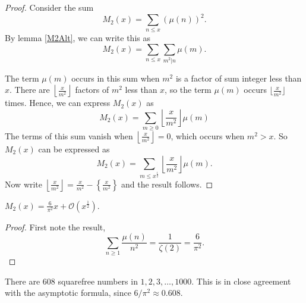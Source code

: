 \documentclass{unswmaths}
\begin{document}
\begin{proof}
    Consider the sum
    \begin{equation*}
        M_2(x) = \sum_{n\leq x} (\mu(n))^2.
    \end{equation*}
    By lemma \ref{M2Alt}, we can write this as
    \begin{equation*}
        M_2(x) = \sum_{n\leq x}\sum_{m^2|n}\mu(m).
    \end{equation*}
    
    The term $\mu(m)$ occurs in this sum when $m^2$ is a factor of sum integer
    less than $x$. There are $\left\lfloor \frac{x}{m^2}\right\rfloor$ factors of $m^2$
    less than $x$, so the term $\mu(m)$ occurs $\lfloor \frac{x}{m^2}\rfloor$
    times. Hence, we can express $M_2(x)$ as
    \begin{equation*}
        M_2(x) = \sum_{m\geq0} \left\lfloor\frac{x}{m^2}\right\rfloor\mu(m)
    \end{equation*}
    The terms of this sum vanish when $\left\lfloor \frac{x}{m^2}\right\rfloor = 0$,
    which occurs when $m^2 > x$. So $M_2(x)$ can be expressed as
    \begin{equation*}
        M_2(x) = \sum_{m\leq x^\frac{1}{2}}\left\lfloor\frac{x}{m^2}\right\rfloor\mu(m).
    \end{equation*}
    Now write $\left\lfloor\frac{x}{m^2}\right\rfloor = \frac{x}{m^2}-\left\{\frac{x}{m^2}\right\}$
    and the result follows.
\end{proof}
\begin{unswthm}
    $M_2(x) = \frac{6}{\pi^2}x+\mathcal{O}(x^\frac{1}{2})$.
\end{unswthm}
\begin{proof}
    First note the result,
    \begin{equation*}
        \sum_{n\geq 1} \frac{\mu(n)}{n^2} = \frac{1}{\zeta(2)} = \frac{6}{\pi^2}.
    \end{equation*}
    
    
\end{proof}
\begin{unswrem}
    There are $608$ squarefree numbers in $1,2,3,\ldots,1000$. 
    This is in close agreement with the asymptotic formula,
    since $6/\pi^2 \approx 0.608$.
\end{unswrem}
\end{document}
